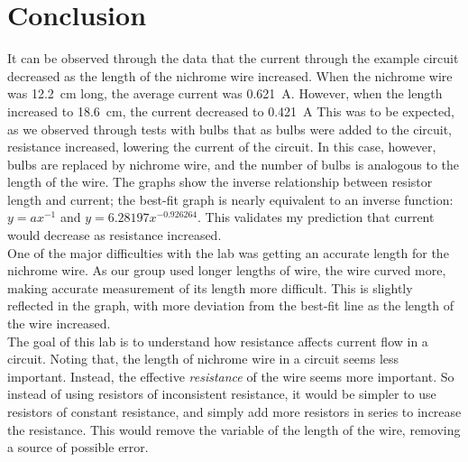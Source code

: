 \documentclass[a4paper]{article}
\numberwithin{equation}{subsection}
\begin{document}
        \section{Conclusion}
            It can be observed through the data that the current through the example
            circuit decreased as the length of the nichrome wire increased. When
            the nichrome wire was \SI{12.2}{\cm} long, the average current was
            \SI{0.621}{\A}. However, when the length increased to \SI{18.6}{\cm},
            the current decreased to \SI{0.421}{\A} This was to be expected, as we
            observed through tests with bulbs that as bulbs were added to the circuit,
            resistance increased, lowering the current of the circuit. In this case,
            however, bulbs are replaced by nichrome wire, and the number of bulbs
            is analogous to the length of the wire. The graphs show the inverse
            relationship between resistor length and current; the best-fit graph
            is nearly equivalent to an inverse function: \(y=ax^{-1}\) and
            \(y=6.28197x^{-0.926264}\). This validates my prediction that current
            would decrease as resistance increased.\\
            One of the major difficulties with the lab was getting an accurate length
            for the nichrome wire. As our group used longer lengths of wire, the wire
            curved more, making accurate measurement of its length more difficult. This
            is slightly reflected in the graph, with more deviation from the best-fit
            line as the length of the wire increased.\\
            The goal of this lab is to understand how resistance affects current flow
            in a circuit. Noting that, the length of nichrome wire in a circuit seems
            less important. Instead, the effective \textit{resistance} of the wire
            seems more important. So instead of using resistors of inconsistent resistance,
            it would be simpler to use resistors of constant resistance, and simply
            add more resistors in series to increase the resistance. This would remove
            the variable of the length of the wire, removing a source of possible error.
\end{document}
